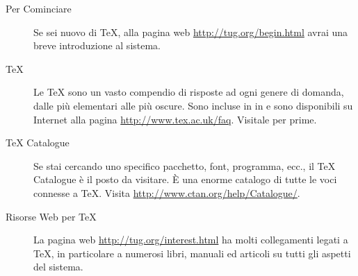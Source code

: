 \documentclass{article}
\begin{document}
\begin{description}
\item [Per Cominciare] Se sei nuovo di \TeX, alla pagina web
  \url{http://tug.org/begin.html} avrai una breve introduzione al sistema.

\item [\TeX{} ] Le \TeX{}  sono un vasto compendio di
  risposte ad ogni genere di domanda, dalle più elementari alle più
  oscure. Sono incluse in \TL{} in
   e sono disponibili
  su Internet alla pagina \url{http://www.tex.ac.uk/faq}. Visitale per
  prime.

\item [\TeX{} Catalogue] Se stai cercando uno specifico pacchetto, font,
  programma, ecc., il \TeX{} Catalogue è il posto da visitare. È una
  enorme catalogo di tutte le voci connesse a \TeX. Visita
  \url{http://www.ctan.org/help/Catalogue/}.

\item [Risorse Web per \TeX{}] La pagina web
  \url{http://tug.org/interest.html} ha molti collegamenti legati a
  \TeX{}, in particolare a numerosi libri, manuali ed articoli su tutti
  gli aspetti del sistema.


\end{description}
\end{document}
